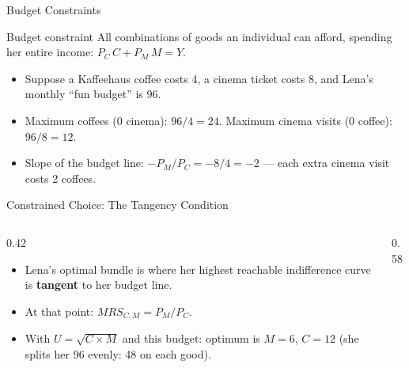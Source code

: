 \documentclass[11pt,aspectratio=169]{beamer}
\begin{document}
\begin{frame}{Budget Constraints}
  \begin{block}{Budget constraint}
    All combinations of goods an individual can afford, spending her entire income: $P_C \, C + P_M \, M = Y$.
  \end{block}
  \begin{itemize}
    \item Suppose a Kaffeehaus coffee costs \texteuro{}4, a cinema ticket costs \texteuro{}8, and Lena's monthly ``fun budget'' is \texteuro{}96.
    \item Maximum coffees (0 cinema): $96/4 = 24$. Maximum cinema visits (0 coffee): $96/8 = 12$.
    \item Slope of the budget line: $-P_M/P_C = -8/4 = -2$ --- each extra cinema visit costs 2 coffees.
  \end{itemize}
\end{frame}

\begin{frame}{Constrained Choice: The Tangency Condition}
  \begin{columns}[T]
    \begin{column}{0.42\textwidth}
      \begin{itemize}
        \item Lena's optimal bundle is where her highest reachable indifference curve is \textbf{tangent} to her budget line.
        \item At that point: $MRS_{C,M} = P_M/P_C$.
        \item With $U=\sqrt{C\times M}$ and this budget: optimum is $M=6$, $C=12$ (she splits her \texteuro{}96 evenly: \texteuro{}48 on each good).
      \end{itemize}
    \end{column}
    \begin{column}{0.58\textwidth}
      \begin{center}
      \end{center}
    \end{column}
  \end{columns}
\end{frame}
\end{document}
